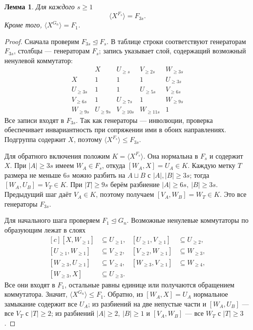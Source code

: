\documentclass[11pt,a4paper]{article}
\newtheorem{lemma}[theorem]{Лемма}
\theoremstyle{definition}
\theoremstyle{remark}
\begin{document}
\begin{lemma}\label{lem:filtration}
Для каждого \(s\ge1\)
\[
 \langle X^{F_s}\rangle=F_{3s}.
\]
Кроме того, \(\langle X^{G_n}\rangle=F_1\).
\end{lemma}
\begin{proof}
Сначала проверим \(F_{3s}\trianglelefteq F_s\).
В таблице строки соответствуют генераторам \(F_{3s}\),
столбцы --- генераторам \(F_s\); запись указывает слой,
содержащий возможный ненулевой коммутатор:
\[
 \begin{array}{c|cccc}
 &X&U_{\ge s}&V_{\ge2s}&W_{\ge3s}\\ \hline
 X&1&1&1&U_{\ge3s}\\
 U_{\ge3s}&1&1&U_{\ge5s}&V_{\ge6s}\\
 V_{\ge6s}&1&U_{\ge7s}&1&W_{\ge9s}\\
 W_{\ge9s}&U_{\ge9s}&V_{\ge10s}&W_{\ge11s}&1
 \end{array}
\]
Все записи входят в \(F_{3s}\).
Так как генераторы --- инволюции, проверка обеспечивает
инвариантность при сопряжении ими в обоих направлениях.
Подгруппа содержит \(X\), поэтому
\(\langle X^{F_s}\rangle\le F_{3s}\).

Для обратного включения положим \(K=\langle X^{F_s}\rangle\).
Она нормальна в \(F_s\) и содержит \(X\).
При \(|A|\ge3s\) имеем \(W_A\in F_s\), откуда
\([W_A,X]=U_A\in K\).
Каждую метку \(T\) размера не меньше \(6s\)
можно разбить на \(A\sqcup B\) с \(|A|,|B|\ge3s\);
тогда \([W_A,U_B]=V_T\in K\).
При \(|T|\ge9s\) берём разбиение
\(|A|\ge6s,\ |B|\ge3s\).
Предыдущий шаг даёт \(V_A\in K\), поэтому получаем
\([V_A,W_B]=W_T\in K\).
Это все генераторы \(F_{3s}\).

Для начального шага проверяем \(F_1\trianglelefteq G_n\).
Возможные ненулевые коммутаторы по образующим лежат в слоях
\[
 \begin{aligned}[c]
 [X,W_{\ge1}]&\subseteq U_{\ge1},&
 [U_{\ge1},V_{\ge1}]&\subseteq U_{\ge2},\\
 [U_{\ge1},W_{\ge1}]&\subseteq V_{\ge2},&
 [V_{\ge2},W_{\ge1}]&\subseteq W_{\ge3},\\
 [W_{\ge3},U_{\ge1}]&\subseteq V_{\ge4},&
 [W_{\ge3},V_{\ge1}]&\subseteq W_{\ge4},\\
 [W_{\ge3},X]&\subseteq U_{\ge3}.
 \end{aligned}
\]
Все они входят в \(F_1\), остальные равны единице
или получаются обращением коммутатора.
Значит, \(\langle X^{G_n}\rangle\le F_1\).
Обратно, из \([W_A,X]=U_A\) нормальное замыкание содержит
все \(U_A\); из разбиений на две непустые части и
\([W_A,U_B]\) --- все \(V_T\) с \(|T|\ge2\);
из разбиений \(|A|\ge2,\ |B|\ge1\) и
\([V_A,W_B]\) --- все \(W_T\) с \(|T|\ge3\).
\end{proof}
\end{document}
